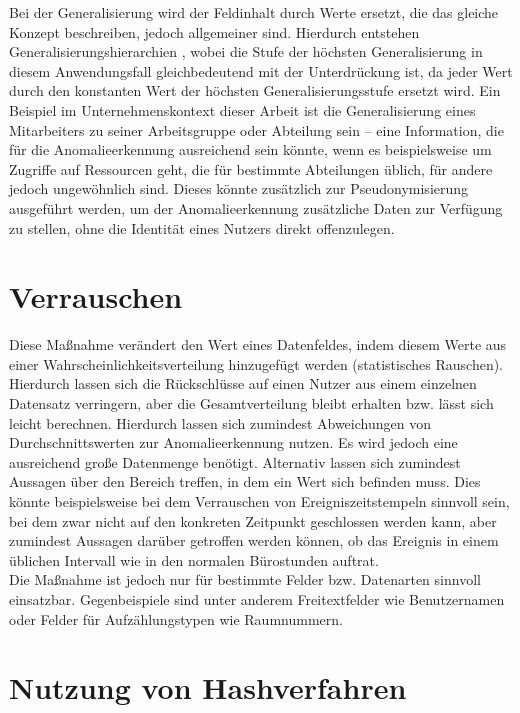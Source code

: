 Bei der Generalisierung wird der Feldinhalt durch Werte ersetzt, die das gleiche Konzept beschreiben, jedoch allgemeiner sind. Hierdurch entstehen Generalisierungshierarchien , wobei die Stufe der höchsten Generalisierung in diesem Anwendungsfall gleichbedeutend mit der Unterdrückung ist, da jeder Wert durch den konstanten Wert der höchsten Generalisierungsstufe ersetzt wird. Ein Beispiel im Unternehmenskontext dieser Arbeit ist die Generalisierung eines Mitarbeiters zu seiner Arbeitsgruppe oder Abteilung sein -- eine Information, die für die Anomalieerkennung ausreichend sein könnte, wenn es beispielsweise um Zugriffe auf Ressourcen geht, die für bestimmte Abteilungen üblich, für andere jedoch ungewöhnlich sind. Dieses könnte zusätzlich zur Pseudonymisierung ausgeführt werden, um der Anomalieerkennung zusätzliche Daten zur Verfügung zu stellen, ohne die Identität eines Nutzers direkt offenzulegen.

\section{Verrauschen} %

Diese Maßnahme verändert den Wert eines Datenfeldes, indem diesem Werte aus einer Wahrscheinlichkeitsverteilung hinzugefügt werden (statistisches Rauschen). Hierdurch lassen sich die Rückschlüsse auf einen Nutzer aus einem einzelnen Datensatz verringern, aber die Gesamtverteilung bleibt erhalten bzw. lässt sich leicht berechnen. Hierdurch lassen sich zumindest Abweichungen von Durchschnittswerten zur Anomalieerkennung nutzen. Es wird jedoch eine ausreichend große Datenmenge benötigt. Alternativ lassen sich zumindest Aussagen über den Bereich treffen, in dem ein Wert sich befinden muss. Dies könnte beispielsweise bei dem Verrauschen von Ereigniszeitstempeln sinnvoll sein, bei dem zwar nicht auf den konkreten Zeitpunkt geschlossen werden kann, aber zumindest Aussagen darüber getroffen werden können, ob das Ereignis in einem üblichen Intervall wie in den normalen Bürostunden auftrat.\\
Die Maßnahme ist jedoch nur für bestimmte Felder bzw. Datenarten sinnvoll einsatzbar. Gegenbeispiele sind unter anderem Freitextfelder wie Benutzernamen oder Felder für Aufzählungstypen wie Raumnummern. 

\section{Nutzung von Hashverfahren}


